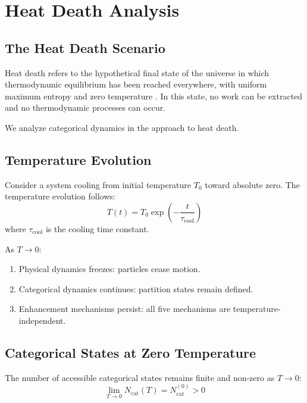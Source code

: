 \section{Heat Death Analysis}
\label{sec:heatdeath}

\subsection{The Heat Death Scenario}

Heat death refers to the hypothetical final state of the universe in which thermodynamic equilibrium has been reached everywhere, with uniform maximum entropy and zero temperature \cite{helmholtz1854,kelvin1852}. In this state, no work can be extracted and no thermodynamic processes can occur.

We analyze categorical dynamics in the approach to heat death.

\subsection{Temperature Evolution}

Consider a system cooling from initial temperature $T_0$ toward absolute zero. The temperature evolution follows:
\begin{equation}
    T(t) = T_0 \exp\left(-\frac{t}{\tau_{\text{cool}}}\right)
\end{equation}
where $\tau_{\text{cool}}$ is the cooling time constant.

As $T \to 0$:
\begin{enumerate}
    \item Physical dynamics freezes: particles cease motion.
    \item Categorical dynamics continues: partition states remain defined.
    \item Enhancement mechanisms persist: all five mechanisms are temperature-independent.
\end{enumerate}

\subsection{Categorical States at Zero Temperature}

\begin{theorem}
The number of accessible categorical states remains finite and non-zero as $T \to 0$:
\begin{equation}
    \lim_{T \to 0} N_{\text{cat}}(T) = N_{\text{cat}}^{(0)} > 0
\end{equation}
\end{theorem}

